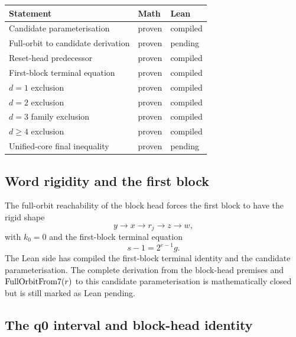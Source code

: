 \begin{center}
\begin{tabular}{lll}
\toprule
Statement & Math & Lean \\
\midrule
Candidate parameterisation & proven & compiled \\
Full-orbit to candidate derivation & proven & pending \\
Reset-head predecessor & proven & compiled \\
First-block terminal equation & proven & compiled \\
$d=1$ exclusion & proven & compiled \\
$d=2$ exclusion & proven & compiled \\
$d=3$ family exclusion & proven & compiled \\
$d\ge4$ exclusion & proven & compiled \\
Unified-core final inequality & proven & pending \\
\bottomrule
\end{tabular}
\end{center}

\subsection{Word rigidity and the first block}

The full-orbit reachability of the block head forces the first block to
have the rigid shape
\begin{equation*}
  y\longrightarrow x\longrightarrow r_j\longrightarrow z
  \longrightarrow w,
\end{equation*}
with $k_0=0$ and the first-block terminal equation
\begin{equation*}
  s-1=2^{e-1}g.
\end{equation*}
The Lean side has compiled the first-block terminal identity and the
candidate parameterisation.  The complete derivation from the
block-head premises and $\mathrm{FullOrbitFrom7}(r)$ to this candidate
parameterisation is mathematically closed but is still marked as Lean
pending.

\subsection{The q0 interval and block-head identity}

